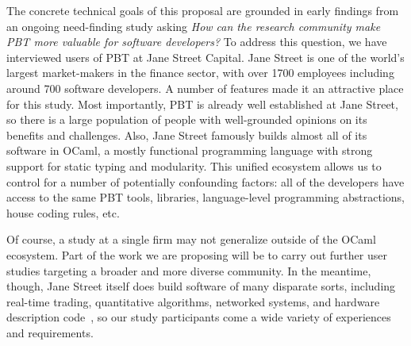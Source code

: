 
\label{sec:motivation}
%
The concrete technical goals of this proposal are grounded in early
findings from an ongoing need-finding study asking {\em How can the
  research community make PBT more valuable for software developers?}
%
\iflater {}\fi
%
%
To address this question, we have interviewed users of PBT at Jane
Street Capital. Jane Street is one of the world's largest
market-makers in the finance sector, with over 1700 employees
including around 700 software developers.  A number of features made
it an attractive place for this study.  Most importantly, PBT is
already well established at Jane Street, so there is a large
population of people with well-grounded opinions on its benefits and
challenges.  Also, Jane Street famously builds almost all of its
software in OCaml, a mostly functional programming language with
strong support for static typing and modularity. This unified
ecosystem allows us to control for a number of potentially confounding
factors: all of the developers have access to the same PBT tools,
libraries, language-level programming abstractions, house coding
rules, etc.

Of course, a study at a single firm may not generalize outside of the
OCaml ecosystem. Part of the work we are proposing will be to carry
out further user studies targeting a broader and more diverse
community.  In the meantime, though, Jane Street itself does build
software of many disparate sorts, including real-time trading,
quantitative algorithms, networked systems, and hardware description
code~\cite{signalsandthreads}, so our study participants come a wide
variety of experiences and requirements.

